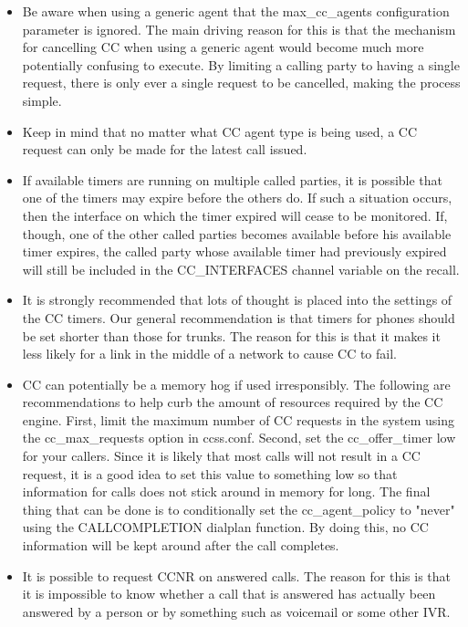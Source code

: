 \begin{itemize}
\item Be aware when using a generic agent that the max\_cc\_agents
configuration parameter is ignored. The main driving reason for
this is that the mechanism for cancelling CC when using a generic
agent would become much more potentially confusing to execute. By
limiting a calling party to having a single request, there is only
ever a single request to be cancelled, making the process simple.

\item Keep in mind that no matter what CC agent type is being used,
a CC request can only be made for the latest call issued.

\item If available timers are running on multiple called parties,
it is possible that one of the timers may expire before the others
do. If such a situation occurs, then the interface on which the
timer expired will cease to be monitored. If, though, one of the
other called parties becomes available before his available timer
expires, the called party whose available timer had previously
expired will still be included in the CC\_INTERFACES channel
variable on the recall.

\item It is strongly recommended that lots of thought is placed
into the settings of the CC timers. Our general recommendation is
that timers for phones should be set shorter than those for trunks.
The reason for this is that it makes it less likely for a link in
the middle of a network to cause CC to fail.

\item CC can potentially be a memory hog if used irresponsibly. The
following are recommendations to help curb the amount of resources
required by the CC engine. First, limit the maximum number of
CC requests in the system using the cc\_max\_requests option in
ccss.conf. Second, set the cc\_offer\_timer low for your callers. Since
it is likely that most calls will not result in a CC request, it is
a good idea to set this value to something low so that information
for calls does not stick around in memory for long. The final thing
that can be done is to conditionally set the cc\_agent\_policy to
"never" using the CALLCOMPLETION dialplan function. By doing this,
no CC information will be kept around after the call completes.

\item It is possible to request CCNR on answered calls. The reason
for this is that it is impossible to know whether a call that is
answered has actually been answered by a person or by something
such as voicemail or some other IVR.


\end{itemize}
